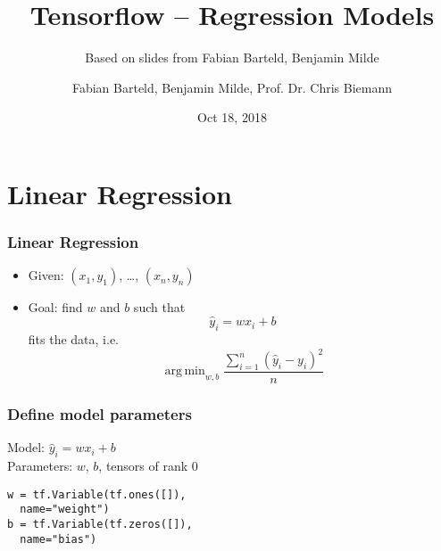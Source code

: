 \documentclass{beamer}
\title{Tensorflow -- Regression Models}
\subtitle{Based on slides from Fabian Barteld, Benjamin Milde}
\author{ Fabian Barteld, Benjamin Milde, Prof. Dr. Chris Biemann}
\date[18.10.2018]{Oct 18, 2018}
\DeclareMathOperator*{\argmin}{arg\,min}
\begin{document}
\maketitle

\section{Linear Regression}

\begin{frame}
\frametitle{Linear Regression}

\begin{itemize}
\item Given: $(x_1, y_1)$, \ldots, $(x_n,y_n)$
\item Goal: find $w$ and $b$ such that
  \begin{displaymath}
    \hat{y}_i = wx_i + b
  \end{displaymath}
  fits the data, i.e.
  \begin{displaymath}
    \argmin_{w, b} \frac{\sum^n_{i=1} (\hat{y}_i - y_i)^2}{n}
  \end{displaymath}
\end{itemize}

\end{frame}

\begin{frame}[fragile]
\frametitle{Define model parameters}
Model: $\hat{y}_i = wx_i + b$\\
Parameters: $w$, $b$, tensors of rank $0$

\begin{lstlisting}
w = tf.Variable(tf.ones([]),
  name="weight")
b = tf.Variable(tf.zeros([]),
  name="bias")
\end{lstlisting}
\end{frame}
\end{document}
